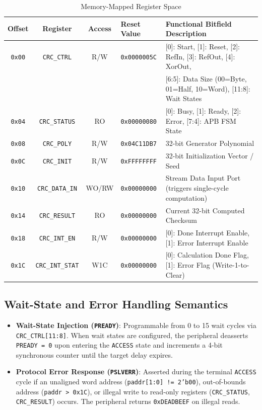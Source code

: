 \documentclass[11pt,a4paper]{article}
\begin{document}
\begin{table}[h!]
\centering
\small
\renewcommand{\arraystretch}{1.15}
\caption{Memory-Mapped Register Space}
\label{tab:reg_map}
\begin{tabular*}{\textwidth}{@{\extracolsep{\fill}}cccll@{}}
\toprule
\textbf{Offset} & \textbf{Register} & \textbf{Access} & \textbf{Reset Value} & \textbf{Functional Bitfield Description} \\
\midrule
\texttt{0x00} & \texttt{CRC\_CTRL}     & R/W  & \texttt{0x0000005C} & [0]: Start, [1]: Reset, [2]: RefIn, [3]: RefOut, [4]: XorOut, \\
              &                        &      &                     & [6:5]: Data Size (00=Byte, 01=Half, 10=Word), [11:8]: Wait States \\
\texttt{0x04} & \texttt{CRC\_STATUS}   & RO   & \texttt{0x00000080} & [0]: Busy, [1]: Ready, [2]: Error, [7:4]: APB FSM State \\
\texttt{0x08} & \texttt{CRC\_POLY}     & R/W  & \texttt{0x04C11DB7} & 32-bit Generator Polynomial \\
\texttt{0x0C} & \texttt{CRC\_INIT}     & R/W  & \texttt{0xFFFFFFFF} & 32-bit Initialization Vector / Seed \\
\texttt{0x10} & \texttt{CRC\_DATA\_IN} & WO/RW& \texttt{0x00000000} & Stream Data Input Port (triggers single-cycle computation) \\
\texttt{0x14} & \texttt{CRC\_RESULT}   & RO   & \texttt{0x00000000} & Current 32-bit Computed Checksum \\
\texttt{0x18} & \texttt{CRC\_INT\_EN}   & R/W  & \texttt{0x00000000} & [0]: Done Interrupt Enable, [1]: Error Interrupt Enable \\
\texttt{0x1C} & \texttt{CRC\_INT\_STAT} & W1C  & \texttt{0x00000000} & [0]: Calculation Done Flag, [1]: Error Flag (Write-1-to-Clear) \\
\bottomrule
\end{tabular*}
\end{table}

\subsection{Wait-State and Error Handling Semantics}
\begin{itemize}
    \item \textbf{Wait-State Injection (\texttt{PREADY})}: Programmable from 0 to 15 wait cycles via \texttt{CRC\_CTRL[11:8]}. When wait states are configured, the peripheral deasserts \texttt{PREADY = 0} upon entering the \texttt{ACCESS} state and increments a 4-bit synchronous counter until the target delay expires.
    \item \textbf{Protocol Error Response (\texttt{PSLVERR})}: Asserted during the terminal \texttt{ACCESS} cycle if an unaligned word address (\texttt{paddr[1:0] != 2'b00}), out-of-bounds address (\texttt{paddr > 0x1C}), or illegal write to read-only registers (\texttt{CRC\_STATUS}, \texttt{CRC\_RESULT}) occurs. The peripheral returns \texttt{0xDEADBEEF} on illegal reads.
\end{itemize}
\end{document}
